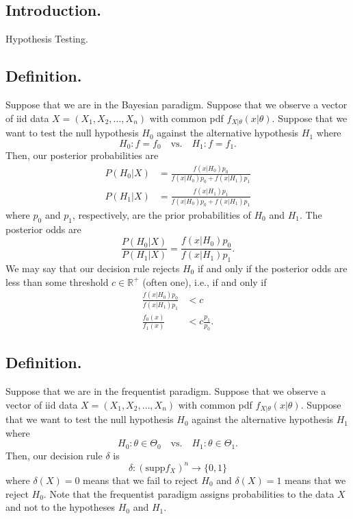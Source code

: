 \documentclass[titlepage]{article}
\begin{document}
\newpage {}

\subsection{Introduction.} Hypothesis Testing.

\subsection{Definition.} Suppose that we are in the Bayesian paradigm. Suppose that we observe a vector of iid data $X = (X_{1}, X_{2}, \ldots, X_{n})$ with common pdf $f_{X|\theta}(x|\theta)$. Suppose that we want to test the null hypothesis $H_{0}$ against the alternative hypothesis $H_{1}$ where
$$H_{0}: f = f_{0} \quad \text{vs.} \quad H_{1}: f = f_{1}.$$
Then, our posterior probabilities are 
\begin{align*}
    P(H_{0}|X) &= \frac{f(x|H_{0})p_{0}}{f(x|H_{0})p_{0} + f(x|H_{1})p_{1}} \\
    P(H_{1}|X) &= \frac{f(x|H_{1})p_{1}}{f(x|H_{0})p_{0} + f(x|H_{1})p_{1}}
\end{align*}
where $p_{0}$ and $p_{1}$, respectively, are the prior probabilities of $H_{0}$ and $H_{1}$. The posterior odds are 
$$\frac{P(H_{0}|X)}{P(H_{1}|X)} = \frac{f(x|H_{0})p_{0}}{f(x|H_{1})p_{1}}.$$
We may say that our decision rule rejects $H_{0}$ if and only if the posterior odds are less than some threshold $c \in \mathbb{R}^{+}$ (often one), i.e., if and only if 
\begin{align*}
    \frac{f(x|H_{0})p_{0}}{f(x|H_{1})p_{1}} &< c \\
                  \frac{f_{0}(x)}{f_{1}(x)} &< c\frac{p_{1}}{p_{0}}.
\end{align*}

\subsection{Definition.} Suppose that we are in the frequentist paradigm. Suppose that we observe a vector of iid data $X = (X_{1}, X_{2}, \ldots, X_{n})$ with common pdf $f_{X|\theta}(x|\theta)$. Suppose that we want to test the null hypothesis $H_{0}$ against the alternative hypothesis $H_{1}$ where 
$$H_{0}: \theta \in \Theta_{0} \quad \text{vs.} \quad H_{1}: \theta \in \Theta_{1}.$$
Then, our decision rule $\delta$ is 
$$\delta: (\text{supp} f_{X})^{n} \to \{0, 1\}$$
where $\delta(X) = 0$ means that we fail to reject $H_{0}$ and $\delta(X) = 1$ means that we reject $H_{0}$. Note that the frequentist paradigm assigns probabilities to the data $X$ and not to the hypotheses $H_{0}$ and $H_{1}$.
\end{document}
